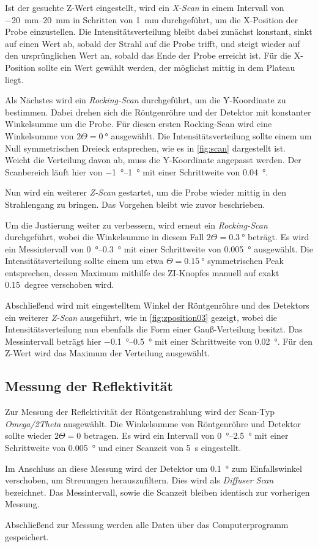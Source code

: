 Ist der gesuchte Z-Wert eingestellt,
wird ein \emph{X-Scan} in einem Intervall von \SIrange{-20}{20}{\milli\meter} in Schritten von \SI{1}{\milli\meter} durchgeführt,
um die X-Position der Probe einzustellen.
Die Intensitätsverteilung bleibt dabei zunächst konstant,
sinkt auf einen Wert ab,
sobald der Strahl auf die Probe trifft,
und steigt wieder auf den ursprünglichen Wert an,
sobald das Ende der Probe erreicht ist.
Für die X-Position sollte ein Wert gewählt werden,
der möglichst mittig in dem Plateau liegt.

Als Nächstes wird ein \emph{Rocking-Scan} durchgeführt,
um die Y-Koordinate zu bestimmen.
Dabei drehen sich die Röntgenröhre und der Detektor mit konstanter Winkelsumme um die Probe.
Für diesen ersten Rocking-Scan wird eine Winkelsumme von $2 \Theta = \SI{0}{\degree}$ ausgewählt.
Die Intensitätsverteilung sollte einem um Null symmetrischen Dreieck entsprechen,
wie es in \autoref{fig:scan} dargestellt ist.
Weicht die Verteilung davon ab,
muss die Y-Koordinate angepasst werden.
Der Scanbereich läuft hier von \SIrange{-1}{1}{\degree} mit einer Schrittweite von \SI{0.04}{\degree}.

Nun wird ein weiterer \emph{Z-Scan} gestartet,
um die Probe wieder mittig in den Strahlengang zu bringen.
Das Vorgehen bleibt wie zuvor beschrieben.

Um die Justierung weiter zu verbessern,
wird erneut ein \emph{Rocking-Scan} durchgeführt,
wobei die Winkelsumme in diesem Fall $2 \Theta = \SI{0.3}{\degree}$ beträgt.
Es wird ein Messintervall von \SIrange{0}{0.3}{\degree} mit einer Schrittweite von \SI{0.005}{\degree} ausgewählt.
Die Intensitätsverteilung sollte einem um etwa $\Theta = \SI{0.15}{\degree}$ symmetrischen Peak entsprechen,
dessen Maximum mithilfe des ZI-Knopfes manuell auf exakt \SI{0.15}{degree} verschoben wird.

Abschließend wird mit eingestelltem Winkel der Röntgenröhre und des Detektors ein weiterer \emph{Z-Scan} ausgeführt,
wie in \autoref{fig:zposition03} gezeigt,
wobei die Intensitätsverteilung nun ebenfalls die Form einer Gauß-Verteilung besitzt.
Das Messintervall beträgt hier \SIrange{-0.1}{0.5}{\degree} mit einer Schrittweite von \SI{0.02}{\degree}.
Für den Z-Wert wird das Maximum der Verteilung ausgewählt.


\subsection{Messung der Reflektivität}

Zur Messung der Reflektivität der Röntgenstrahlung wird der Scan-Typ \emph{Omega/2Theta} ausgewählt.
Die Winkelsumme von Röntgenröhre und Detektor sollte wieder $2 \Theta = 0$ betragen.
Es wird ein Intervall von \SIrange{0}{2.5}{\degree} mit einer Schrittweite von \SI{0.005}{\degree} und einer Scanzeit von \SI{5}{\second} eingestellt.

Im Anschluss an diese Messung wird der Detektor um \SI{0.1}{\degree} zum Einfallswinkel verschoben,
um Streuungen herauszufiltern.
Dies wird als \emph{Diffuser Scan} bezeichnet.
Das Messintervall,
sowie die Scanzeit bleiben identisch zur vorherigen Messung.

Abschließend zur Messung werden alle Daten über das Computerprogramm gespeichert.
